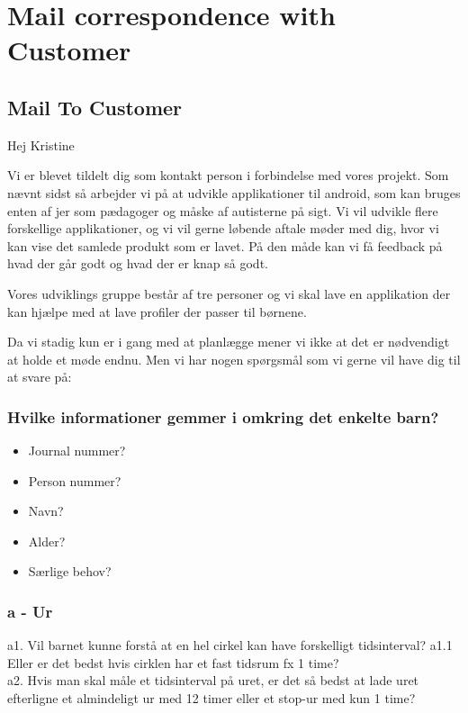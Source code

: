 \section{Mail correspondence with Customer}
\label{sec:customerReq}
\subsection{Mail To Customer}
Hej Kristine

Vi er blevet tildelt dig som kontakt person i forbindelse med vores projekt. Som n\ae{}vnt sidst s\aa{} arbejder vi p\aa{} at udvikle applikationer til android, som kan bruges enten af jer som p\ae{}dagoger og m\aa{}ske af autisterne p\aa{} sigt. Vi vil udvikle flere forskellige applikationer, og vi vil gerne l\o{}bende aftale m\o{}der med dig, hvor vi kan vise det samlede produkt som er lavet. P\aa{} den m\aa{}de kan vi f\aa{} feedback p\aa{} hvad der g\aa{}r godt og hvad der er knap s\aa{} godt.

Vores udviklings gruppe best\aa{}r af tre personer og vi skal lave en applikation der kan hj\ae{}lpe med at lave profiler der passer til b\o{}rnene. 

Da vi stadig kun er i gang med at planl\ae{}gge mener vi ikke at det er n\o{}dvendigt at holde et m\o{}de endnu. Men vi har nogen sp\o{}rgsm\aa{}l som vi gerne vil have dig til at svare p\aa{}:

\subsubsection{Hvilke informationer gemmer i omkring det enkelte barn?}
\begin{itemize}
	\item Journal nummer?
	\item Person nummer?
	\item Navn?
	\item Alder?
	\item S\ae{}rlige behov?
\end{itemize}

\subsubsection{a - Ur}
a1. Vil barnet kunne forst\aa{} at en hel cirkel kan have forskelligt tidsinterval?
a1.1 Eller er det bedst hvis cirklen har et fast tidsrum fx 1 time?
\\
a2. Hvis man skal m\aa{}le et tidsinterval p\aa{} uret, er det s\aa{} bedst at lade uret efterligne et almindeligt ur med 12 timer eller et stop-ur med kun 1 time?

